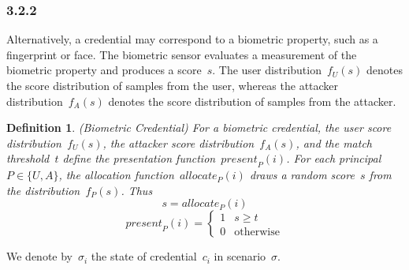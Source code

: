 \documentclass[conference,compsoc]{IEEEtran}
\newtheorem{definition}{Definition}
\begin{document}
\subsubsection*{3.2.2}\label{sec:3.2.2}
Alternatively, a credential may correspond to a biometric property, such as a fingerprint or face. The biometric sensor evaluates a measurement of the biometric property and produces a score~$s$. The user distribution~$f_U(s)$ denotes the score distribution of samples from the user, whereas the attacker distribution~$f_A(s)$ denotes the score distribution of samples from the attacker.
\begin{definition} (Biometric Credential) For a biometric credential, the user score distribution~$f_U(s)$, the attacker score distribution~$f_A(s)$, and the match threshold~$t$ define the presentation function~$\textit{present}_P(i)$. For each principal~${P\in\{U,A\}}$, the allocation function~$\textit{allocate}_P(i)$ draws a random score~$s$ from the distribution~$f_P(s)$. Thus
    \begin{equation*}
    s = \textit{allocate}_P(i)
    \end{equation*}
    \begin{equation*}
    \textit{present}_P(i) = \begin{cases}
        1 &  s \ge t \\
        0 & \text{otherwise}
    \end{cases}
    \end{equation*}
\end{definition}
We denote by~$\sigma_i$ the state of credential~$c_i$ in scenario~$\sigma$. 
\end{document}
